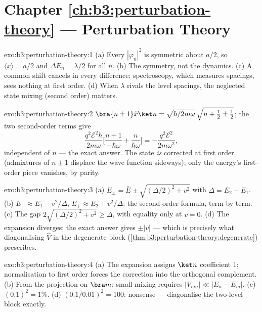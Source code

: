 \section*{Chapter \ref{ch:b3:perturbation-theory} --- Perturbation Theory}

\begin{solution}{exo:b3:perturbation-theory:1}
(a) Every $|\varphi_n|^2$ is symmetric about $a/2$, so $\langle
x\rangle = a/2$ and $\Delta E_n = \lambda/2$ for all $n$. (b) The
symmetry, not the dynamics. (c) A common shift cancels in every
difference: spectroscopy, which measures spacings, sees nothing at
first order. (d) When $\lambda$ rivals the level spacings, the
neglected state mixing (second order) matters.
\end{solution}

\begin{solution}{exo:b3:perturbation-theory:2}
$\bra{n\pm1}\hat x\ket n = \sqrt{\hbar/2m\omega}\,\sqrt{n + \tfrac12
\pm \tfrac12}$; the two second-order terms give
\[
\frac{q^2\mathcal E^2\hbar}{2m\omega}\Big[\frac{n+1}{-\hbar\omega}
+ \frac{n}{\hbar\omega}\Big] = -\frac{q^2\mathcal E^2}{2m\omega^2} ,
\]
independent of $n$ --- the exact answer. The state \emph{is}
corrected at first order (admixtures of $n \pm 1$ displace the
wave function sideways); only the energy's first-order piece
vanishes, by parity.
\end{solution}

\begin{solution}{exo:b3:perturbation-theory:3}
(a) $E_\pm = \bar E \pm \sqrt{(\Delta/2)^2 + v^2}$ with $\Delta =
E_2 - E_1$. (b) $E_- \approx E_1 - v^2/\Delta$, $E_+ \approx E_2 +
v^2/\Delta$: the second-order formula, term by term. (c) The gap
$2\sqrt{(\Delta/2)^2 + v^2} \ge \Delta$, with equality only at $v =
0$. (d) The expansion diverges; the exact answer gives $\pm|v|$ ---
which is precisely what diagonalising $\hat V$ in the degenerate
block (\cref{thm:b3:perturbation-theory:degenerate}) prescribes.
\end{solution}

\begin{solution}{exo:b3:perturbation-theory:4}
(a) The expansion assigns $\ket n$ coefficient $1$; normalisation
to first order forces the correction into the orthogonal
complement. (b) From the projection on $\bra m$; small mixing
requires $|V_{mn}| \ll |E_n - E_m|$. (c) $(0.1)^2 = 1\%$. (d)
$(0.1/0.01)^2 = 100$: nonsense --- diagonalise the two-level block
exactly.
\end{solution}

